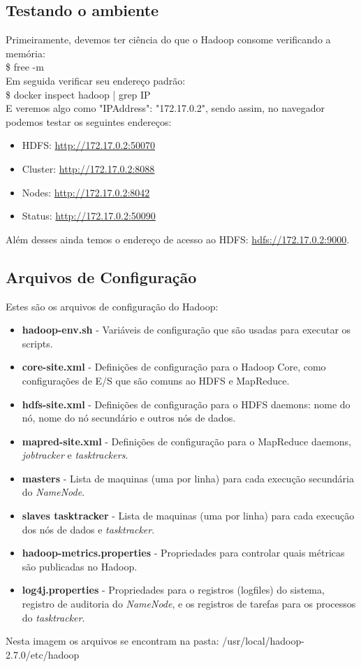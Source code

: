 \documentclass[a4paper,11pt]{article}
\begin{document}
\subsection{Testando o ambiente}
Primeiramente, devemos ter ciência do que o Hadoop consome verificando a memória: \\
{\ttfamily\$ free -m} \\[2mm]
Em seguida verificar seu endereço padrão: \\
{\ttfamily\$ docker inspect hadoop | grep IP} \\[2mm]
E veremos algo como "IPAddress": "172.17.0.2", sendo assim, no navegador podemos testar os seguintes endereços:
\begin{itemize}[noitemsep]
	\item HDFS: \url{http://172.17.0.2:50070}
	\item Cluster: \url{http://172.17.0.2:8088}
	\item Nodes: \url{http://172.17.0.2:8042}
	\item Status: \url{http://172.17.0.2:50090}
\end{itemize}
Além desses ainda temos o endereço de acesso ao HDFS: \url{hdfs://172.17.0.2:9000}.

\subsection{Arquivos de Configuração}
Estes são os arquivos de configuração do Hadoop:
\begin{itemize}
	\item \textbf{hadoop-env.sh} - Variáveis de configuração que são usadas para executar os scripts.
	\item \textbf{core-site.xml} - Definições de configuração para o Hadoop Core, como configurações de E/S que são comuns ao HDFS e MapReduce.
	\item \textbf{hdfs-site.xml} - Definições de configuração para o HDFS daemons: nome do nó, nome do nó secundário e outros nós de dados.
	\item \textbf{mapred-site.xml} - Definições de configuração para o MapReduce daemons, \textit{jobtracker} e \textit{tasktrackers}.
	\item \textbf{masters} - Lista de maquinas (uma por linha) para cada execução secundária do \textit{NameNode}.
	\item \textbf{slaves tasktracker} - Lista de maquinas (uma por linha) para cada execução dos nós de dados e \textit{tasktracker}.
	\item \textbf{hadoop-metrics.properties} - Propriedades para controlar quais métricas são publicadas no Hadoop.
	\item \textbf{log4j.properties} - Propriedades para o registros (logfiles) do sistema, registro de auditoria do \textit{NameNode}, e os registros de tarefas para os processos do \textit{tasktracker}.
\end{itemize}
Nesta imagem os arquivos se encontram na pasta: /usr/local/hadoop-2.7.0/etc/hadoop
\end{document}
